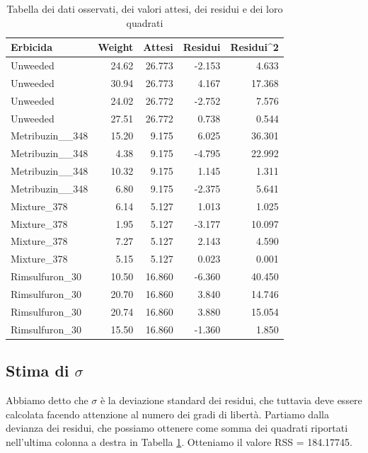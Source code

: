 \documentclass[a4paper,12pt,oneside]{book}
\begin{document}
\begin{table}[t]

\caption{\label{tab:tabResidui}Tabella dei dati osservati, dei valori attesi, dei residui e dei loro quadrati}
\centering
\begin{tabular}{lrrrr}
\toprule
Erbicida & Weight & Attesi & Residui & Residui\textasciicircum{}2\\
\midrule
Unweeded & 24.62 & 26.773 & -2.153 & 4.633\\
Unweeded & 30.94 & 26.773 & 4.167 & 17.368\\
Unweeded & 24.02 & 26.772 & -2.752 & 7.576\\
Unweeded & 27.51 & 26.772 & 0.738 & 0.544\\
Metribuzin\_\_348 & 15.20 & 9.175 & 6.025 & 36.301\\
\addlinespace
Metribuzin\_\_348 & 4.38 & 9.175 & -4.795 & 22.992\\
Metribuzin\_\_348 & 10.32 & 9.175 & 1.145 & 1.311\\
Metribuzin\_\_348 & 6.80 & 9.175 & -2.375 & 5.641\\
Mixture\_378 & 6.14 & 5.127 & 1.013 & 1.025\\
Mixture\_378 & 1.95 & 5.127 & -3.177 & 10.097\\
\addlinespace
Mixture\_378 & 7.27 & 5.127 & 2.143 & 4.590\\
Mixture\_378 & 5.15 & 5.127 & 0.023 & 0.001\\
Rimsulfuron\_30 & 10.50 & 16.860 & -6.360 & 40.450\\
Rimsulfuron\_30 & 20.70 & 16.860 & 3.840 & 14.746\\
Rimsulfuron\_30 & 20.74 & 16.860 & 3.880 & 15.054\\
\addlinespace
Rimsulfuron\_30 & 15.50 & 16.860 & -1.360 & 1.850\\
\bottomrule
\end{tabular}
\end{table}

\hypertarget{stima-di-sigma}{%
\subsection{\texorpdfstring{Stima di \(\sigma\)}{Stima di \textbackslash{}sigma}}\label{stima-di-sigma}}

Abbiamo detto che \(\sigma\) è la deviazione standard dei residui, che tuttavia deve essere calcolata facendo attenzione al numero dei gradi di libertà. Partiamo dalla devianza dei residui, che possiamo ottenere come somma dei quadrati riportati nell'ultima colonna a destra in Tabella \ref{tab:tabResidui}. Otteniamo il valore RSS = 184.17745.
\end{document}
